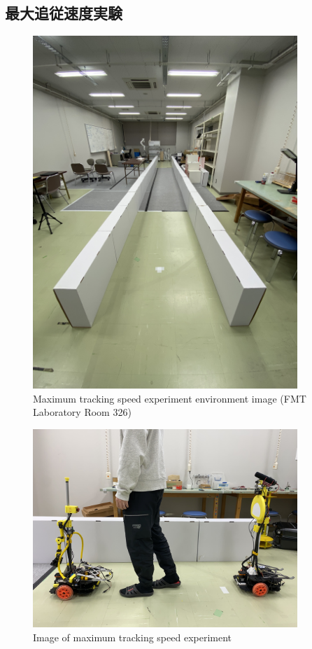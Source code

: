 \subsection{最大追従速度実験}
\begin{figure}[h]
  \begin{center}
  \includegraphics[width=100mm, angle=-90, clip]{figure/experimental_env3.JPG}
  \caption{Maximum tracking speed experiment environment image (FMT Laboratory Room 326)}
  \label{Maximum tracking speed experiment environment image (FMT Laboratory Room 326)}
  \end{center}
\end{figure}

\begin{figure}[h]
  \begin{center}
  \includegraphics[width=100mm,clip]{figure/max_experiment_image.JPG}
  \caption{Image of maximum tracking speed experiment}
  \label{Image of maximum tracking speed experiment}
  \end{center}
\end{figure}

